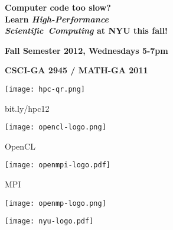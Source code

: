 \documentclass[10pt]{article}
\begin{document}
%
%
\vspace{-5ex}

\begin{center}
  {\bfseries\Large
    Computer code too slow?\\[2mm]
  }
  {\bfseries\Huge
    Learn \emph{High-Performance\\[0.25em]
    Scientific~Computing} at NYU this fall!
  }
\end{center}
\vspace{8mm}



\vspace{1.5cm}
\begin{center}
  {\bfseries\Huge
    Fall Semester 2012, Wednesdays 5-7pm
  }

  {\bfseries\Large CSCI-GA 2945 / MATH-GA 2011 }

\end{center}

\begin{center}
  \begin{minipage}{0.2\textwidth}
    \centering
    \texttt{[image: hpc-qr.png]}

    \LARGE\textsf{bit.ly/hpc12}
  \end{minipage}%
  \begin{minipage}{0.2\textwidth}
    \centering
    \texttt{[image: opencl-logo.png]}

    \Large{}\selectfont OpenCL
  \end{minipage}%
  \begin{minipage}{0.2\textwidth}
    \centering
    \texttt{[image: openmpi-logo.pdf]}

    \Large{}\selectfont MPI
  \end{minipage}%
  \begin{minipage}{0.2\textwidth}
    \texttt{[image: openmp-logo.png]}
  \end{minipage}%
  \begin{minipage}{0.2\textwidth}
    \centering
    \texttt{[image: nyu-logo.pdf]}
  \end{minipage}
\end{center}
\end{document}
